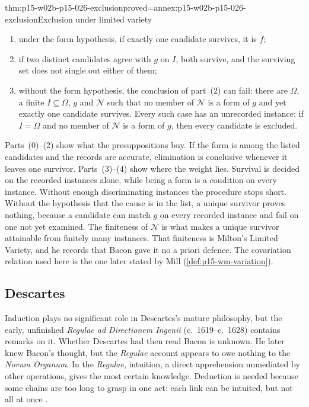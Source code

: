 \begin{hblemma}{thm:p15-w02b-p15-026-exclusion}{proved=annex:p15-w02b-p15-026-exclusion}{Exclusion under limited variety}
\begin{enumerate}
\item under the form hypothesis, if exactly one candidate survives, it is $f$;
\item if two distinct candidates agree with $g$ on $I$, both survive, and
  the surviving set does not single out either of them;
\item without the form hypothesis, the conclusion of part~(2) can fail:
  there are $\Omega$, a finite $I\subseteq\Omega$, $g$ and $\mathcal N$
  such that no member of $\mathcal N$ is a form of $g$ and yet exactly one
  candidate survives. Every such case has an unrecorded instance: if
  $I=\Omega$ and no member of $\mathcal N$ is a form of $g$, then every
  candidate is excluded.
\end{enumerate}
\end{hblemma}

Parts~(0)--(2) show what the presuppositions buy. If the form is among
the listed candidates and the records are accurate, elimination is
conclusive whenever it leaves one survivor. Parts~(3)--(4) show where the
weight lies. Survival is decided on the recorded instances alone, while
being a form is a condition on every instance. Without enough
discriminating instances the procedure stops short. Without the
hypothesis that the cause is in the list, a unique survivor proves
nothing, because a candidate can match $g$ on every recorded instance and
fail on one not yet examined. The finiteness of $\mathcal N$ is what makes
a unique survivor attainable from finitely many instances. That finiteness
is Milton's Limited Variety, and he records that Bacon gave it no a priori
defence. The covariation relation used here is the one later stated by
Mill (\cref{def:p15-wm-variation}).

\subsection{Descartes}

Induction plays no significant role in Descartes's mature philosophy, but
the early, unfinished \emph{Regulae ad Directionem Ingenii}
(c.~1619--c.~1628) contains remarks on it. Whether Descartes had then read
Bacon is unknown. He later knew Bacon's thought, but the \emph{Regulae}
account appears to owe nothing to the \emph{Novum Organum}. In the
\emph{Regulae}, intuition, a direct apprehension unmediated by other
operations, gives the most certain knowledge. Deduction is needed because
some chains are too long to grasp in one act: each link can be intuited,
but not all at once \cite[p.~27]{Milton2011InductionBeforeHume}.

